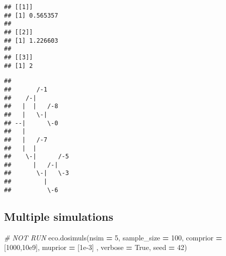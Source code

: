 \documentclass[
]{article}
\newenvironment{Shaded}{\begin{snugshade}}{\end{snugshade}}
\newcommand{\AttributeTok}[1]{\textcolor[rgb]{0.77,0.63,0.00}{#1}}
\newcommand{\CommentTok}[1]{\textcolor[rgb]{0.56,0.35,0.01}{\textit{#1}}}
\newcommand{\ConstantTok}[1]{\textcolor[rgb]{0.00,0.00,0.00}{#1}}
\newcommand{\DecValTok}[1]{\textcolor[rgb]{0.00,0.00,0.81}{#1}}
\newcommand{\FloatTok}[1]{\textcolor[rgb]{0.00,0.00,0.81}{#1}}
\newcommand{\FunctionTok}[1]{\textcolor[rgb]{0.00,0.00,0.00}{#1}}
\newcommand{\NormalTok}[1]{#1}
\newcommand{\OperatorTok}[1]{\textcolor[rgb]{0.81,0.36,0.00}{\textbf{#1}}}
\newcommand{\OtherTok}[1]{\textcolor[rgb]{0.56,0.35,0.01}{#1}}
\newcommand{\SpecialCharTok}[1]{\textcolor[rgb]{0.00,0.00,0.00}{#1}}
\newcommand{\VariableTok}[1]{\textcolor[rgb]{0.00,0.00,0.00}{#1}}
\begin{document}
\begin{verbatim}
## [[1]]
## [1] 0.565357
## 
## [[2]]
## [1] 1.226603
## 
## [[3]]
## [1] 2
\end{verbatim}

\begin{Shaded}
\end{Shaded}

\begin{verbatim}
## 
##       /-1
##    /-|
##   |  |   /-8
##   |   \-|
## --|      \-0
##   |
##   |   /-7
##   |  |
##    \-|      /-5
##      |   /-|
##       \-|   \-3
##         |
##          \-6
\end{verbatim}

\hypertarget{multiple-simulations}{%
\subsection{Multiple simulations}\label{multiple-simulations}}

\begin{Shaded}
\end{Shaded}

\begin{Shaded}
\begin{Highlighting}[]
\CommentTok{\# NOT RUN}
\NormalTok{eco.dosimuls(nsim }\OperatorTok{=} \DecValTok{5}\NormalTok{, sample\_size }\OperatorTok{=} \DecValTok{100}\NormalTok{, comprior }\OperatorTok{=}\NormalTok{ [}\DecValTok{1000}\NormalTok{,}\FloatTok{10e9}\NormalTok{], }
\NormalTok{             muprior }\OperatorTok{=}\NormalTok{ [}\FloatTok{1e{-}3}\NormalTok{] , verbose }\OperatorTok{=} \VariableTok{True}\NormalTok{, seed }\OperatorTok{=} \DecValTok{42}\NormalTok{)}
\end{Highlighting}
\end{Shaded}
\end{document}
